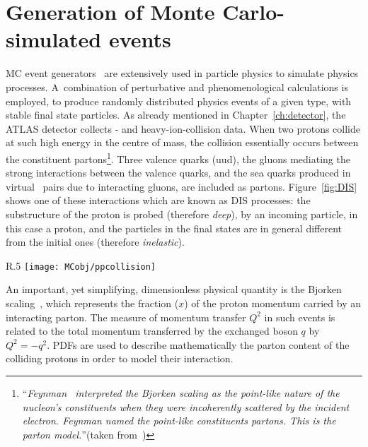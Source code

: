 	\section{Generation of Monte Carlo-simulated events}
	\label{sec:evGen}

		\ac{MC} event generators~\cite{Buckley:2011ms} are extensively used in particle physics to simulate physics processes. A combination of perturbative and phenomenological calculations is employed, to produce randomly distributed physics events of a given type, with stable final state particles. As already mentioned in Chapter~\ref{ch:detector}, the \ac{ATLAS} detector collects \pp- and heavy-ion-collision data. When two protons collide at such high energy in the centre of mass, the collision essentially occurs between the constituent partons\footnote{``\emph{Feynman~\cite{PhysRevLett.23.1415} interpreted the Bjorken scaling as the point-like nature of the nucleon's constituents when they were incoherently scattered by the incident electron. Feynman named the point-like constituents partons. This is the parton model.}''(taken from~\cite{Yan:2014kna})}. Three valence quarks (uud), the gluons mediating the strong interactions between the valence quarks, and the sea quarks produced in virtual \qqbar\ pairs due to interacting gluons, are included as partons. Figure~\ref{fig:DIS} shows one of these interactions which are known as \ac{DIS} processes: the substructure of the proton is probed (therefore \emph{deep}), by an incoming particle, in this case a proton, and the particles in the final states are in general different from the initial ones (therefore \emph{inelastic}).

		\begin{wrapfigure}{R}{.5\textwidth}
			\centering\texttt{[image: MCobj/ppcollision]}
			\caption{\label{fig:DIS} Example of a \pp\ \ac{DIS} event.}
		\end{wrapfigure}
		
		An important, yet simplifying, dimensionless physical quantity is the Bjorken scaling~\cite{PhysRev.179.1547}, which represents the fraction ($x$) of the proton momentum carried by an interacting parton. The measure of momentum transfer $Q^2$ in such events is related to the total momentum transferred by the exchanged boson $q$ by $Q^2 = -q^2$. \acp{PDF} are used to describe mathematically the parton content of the colliding protons in order to model their interaction.  

